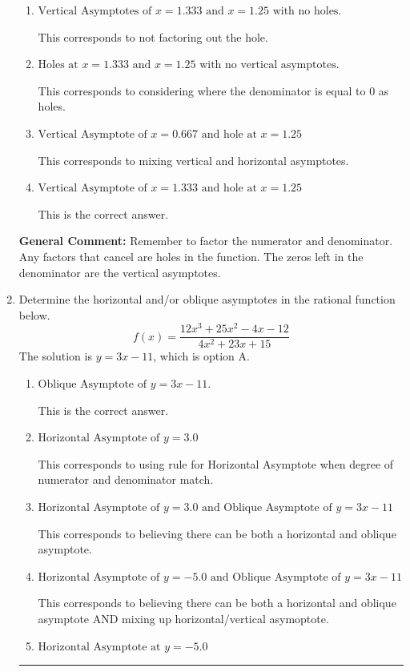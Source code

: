 \documentclass{extbook}[14pt]
\newcommand{\litem}[1]{\item #1

\rule{\textwidth}{0.4pt}}
\begin{document}
\begin{enumerate}
{\begin{enumerate}[label=\Alph*.]
This corresponds to setting the numerator equal to 0.
\item \( \text{Vertical Asymptotes of } x = 1.333 \text{ and } x = 1.25 \text{ with no holes.} \)

This corresponds to not factoring out the hole.
\item \( \text{Holes at } x = 1.333 \text{ and } x = 1.25 \text{ with no vertical asymptotes.} \)

This corresponds to considering where the denominator is equal to 0 as holes.
\item \( \text{Vertical Asymptote of } x = 0.667 \text{ and hole at } x = 1.25 \)

This corresponds to mixing vertical and horizontal asymptotes.
\item \( \text{Vertical Asymptote of } x = 1.333 \text{ and hole at } x = 1.25 \)

This is the correct answer.
\end{enumerate}

\textbf{General Comment:} Remember to factor the numerator and denominator. Any factors that cancel are holes in the function. The zeros left in the denominator are the vertical asymptotes.
}
\litem{
Determine the horizontal and/or oblique asymptotes in the rational function below.
\[ f(x) = \frac{12x^{3} +25 x^{2} -4 x -12}{4x^{2} +23 x + 15} \]The solution is \( y = 3x -11 \), which is option A.\begin{enumerate}[label=\Alph*.]
\item \( \text{Oblique Asymptote of } y = 3x -11. \)

This is the correct answer.
\item \( \text{Horizontal Asymptote of } y = 3.0  \)

This corresponds to using rule for Horizontal Asymptote when degree of numerator and denominator match.
\item \( \text{Horizontal Asymptote of } y = 3.0 \text{ and Oblique Asymptote of } y = 3x -11 \)

This corresponds to believing there can be both a horizontal and oblique asymptote.
\item \( \text{Horizontal Asymptote of } y = -5.0 \text{ and Oblique Asymptote of } y = 3x -11 \)

This corresponds to believing there can be both a horizontal and oblique asymptote AND mixing up horizontal/vertical asymoptote.
\item \( \text{Horizontal Asymptote at } y = -5.0 \)


\end{enumerate}}
\end{enumerate}
\end{document}
